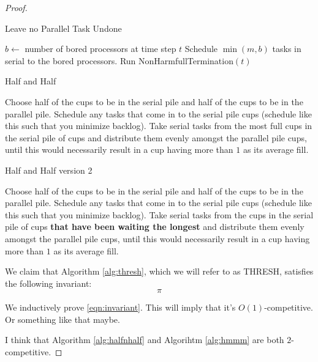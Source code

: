 \documentclass{article}[11pt]
\begin{document}
\begin{proof}
  \begin{algorithm}
    \caption{Leave no Parallel Task Undone}
    \label{alg:hmmm}
    \begin{algorithmic}[1] 
       
        \State $b\gets $ number of bored processors at time step $t$ 
        \State Schedule $\min(m, b)$ tasks in serial to the bored processors.
        \State Run NonHarmfullTermination$(t)$
    \EndProcedure
    \end{algorithmic}
\end{algorithm}

\begin{algorithm}
  \caption{Half and Half}
  \label{alg:halfnhalf}
  \begin{algorithmic}[1] 
    \State Choose half of the cups to be in the serial pile and
    half of the cups to be in the parallel pile.
     
    \State Schedule any tasks that come in to the serial pile cups
    (schedule like this such that you minimize backlog).
    \State Take serial tasks from the most full cups in the
    serial pile of cups and distribute them evenly amongst the
    parallel pile cups, until this would necessarily result in a
    cup having more than $1$ as its average fill.
  \EndProcedure
  \end{algorithmic}
\end{algorithm}

\begin{algorithm}
  \caption{Half and Half version 2}
  \label{alg:halfnhalfv2}
  \begin{algorithmic}[1] 
    \State Choose half of the cups to be in the serial pile and
    half of the cups to be in the parallel pile.
     
    \State Schedule any tasks that come in to the serial pile cups
    (schedule like this such that you minimize backlog).
    \State Take serial tasks from the cups in the
    serial pile of cups \textbf{that have been waiting the
    longest} and distribute them evenly amongst the
    parallel pile cups, until this would necessarily result in a
    cup having more than $1$ as its average fill.
  \EndProcedure
  \end{algorithmic}
\end{algorithm}



We claim that Algorithm \ref{alg:thresh}, which we will refer to as
THRESH, satisfies the following invariant: 
\begin{equation}
  \label{eqn:invariant}
  \pi
\end{equation}

We inductively prove \eqref{eqn:invariant}.
This will imply that it's $O(1)$-competitive. Or something like
that maybe.

I think that Algorithm \ref{alg:halfnhalf} and Algorihtm
\ref{alg:hmmm} are both $2$-competitive.

\end{proof}
\end{document}
